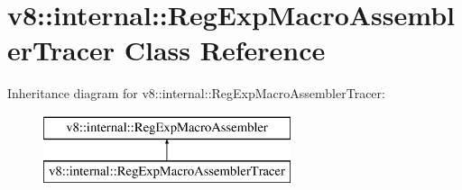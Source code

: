 \hypertarget{classv8_1_1internal_1_1_reg_exp_macro_assembler_tracer}{}\section{v8\+:\+:internal\+:\+:Reg\+Exp\+Macro\+Assembler\+Tracer Class Reference}
\label{classv8_1_1internal_1_1_reg_exp_macro_assembler_tracer}
Inheritance diagram for v8\+:\+:internal\+:\+:Reg\+Exp\+Macro\+Assembler\+Tracer\+:\begin{figure}[H]
\begin{center}
\leavevmode
\includegraphics[height=2.000000cm]{classv8_1_1internal_1_1_reg_exp_macro_assembler_tracer}
\end{center}
\end{figure}
